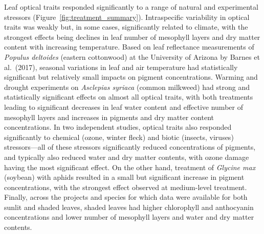 Leaf optical traits responded significantly to a range of natural and experimental stressors (Figure~\ref{fig:treatment_summary}).
Intraspecific variability in optical traits was weakly but, in some cases, significantly related to climate, with the strongest effects being declines in leaf number of mesophyll layers and dry matter content with increasing temperature.
% 
% 
Based on leaf reflectance measurements of \textit{Populus deltoides} (eastern cottonwood) at the University of Arizona by Barnes et al.~(2017), \nocite{barnes_2017_beyond}
% 
% 
seasonal variations in leaf and air temperature had statistically significant but relatively small impacts on pigment concentrations.
Warming and drought experiments on \textit{Asclepias syriaca} (common milkweed) had strong and statistically significant effects on almost all optical traits, with both treatments leading to significant decreases in leaf water content and effective number of mesophyll layers and increases in pigments and dry matter content concentrations.
% 
% 
In two independent studies, optical traits also responded significantly to chemical (ozone, winter fleck) and biotic (insects, viruses) stressors---all of these stressors significantly reduced concentrations of pigments, and typically also reduced water and dry matter contents, with ozone damage having the most significant effect.
% 
% 
% 
% 
On the other hand, treatment of \textit{Glycine max} (soybean) with aphids resulted in a small but significant increase in pigment concentrations, with the strongest effect observed at medium-level treatment.
Finally, across the projects and species for which data were available for both sunlit and shaded leaves, shaded leaves had higher chlorophyll and anthocyanin concentrations and lower number of mesophyll layers and water and dry matter contents.
% 
% 


